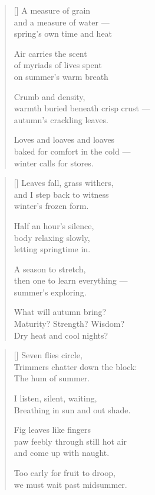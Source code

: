 \begin{verse}[\textwidth]
  A measure of grain\\
  and a measure of water ---\\
  spring's own time and heat

  Air carries the scent\\
  of myriads of lives spent\\
  on summer's warm breath

  Crumb and density,\\
  warmth buried beneath crisp crust ---\\
  autumn's crackling leaves.

  Loves and loaves and loaves\\
  baked for comfort in the cold ---\\
  winter calls for stores.
\end{verse}

\newpage

\begin{verse}[\textwidth]
  Leaves fall, grass withers,\\
  and I step back to witness\\
  winter's frozen form.

  Half an hour's silence,\\
  body relaxing slowly,\\
  letting springtime in.

  A season to stretch,\\
  then one to learn everything ---\\
  summer's exploring.

  What will autumn bring?\\
  Maturity? Strength? Wisdom?\\
  Dry heat and cool nights?
\end{verse}

\newpage

\begin{verse}[\textwidth]
    Seven flies circle,\\
    Trimmers chatter down the block:\\
    The hum of summer.

    \vin I listen, silent, waiting,\\
    \vin Breathing in sun and out shade.

    Fig leaves like fingers\\
    paw feebly through still hot air\\
    and come up with naught.

    \vin Too early for fruit to droop,\\
    \vin we must wait past midsummer.
  \end{verse}

